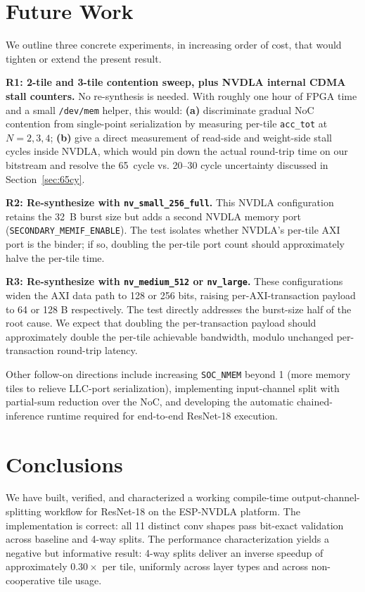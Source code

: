 \documentclass[10pt,sigconf,nonacm]{acmart}
\begin{document}
\section{Future Work}\label{sec:future}

We outline three concrete experiments, in increasing order of cost,
that would tighten or extend the present result.

\noindent\textbf{R1: 2-tile and 3-tile contention sweep, plus NVDLA
internal CDMA stall counters.} No re-synthesis is needed. With
roughly one hour of FPGA time and a small
\texttt{/dev/mem} helper, this would:
\textbf{(a)} discriminate gradual NoC contention from single-point
serialization by measuring per-tile \texttt{acc\_tot} at $N=2,3,4$;
\textbf{(b)} give a direct measurement of read-side and weight-side
stall cycles inside NVDLA, which would pin down the actual
round-trip time on our bitstream and resolve the 65~cycle vs.
20--30 cycle uncertainty discussed in Section~\ref{sec:65cy}.

\noindent\textbf{R2: Re-synthesize with \texttt{nv\_small\_256\_full}.}
This NVDLA configuration retains the 32~B burst size but adds a
second NVDLA memory port (\texttt{SECONDARY\_MEMIF\_ENABLE}). The
test isolates whether NVDLA's per-tile AXI port is the binder; if
so, doubling the per-tile port count should approximately halve
the per-tile time.

\noindent\textbf{R3: Re-synthesize with \texttt{nv\_medium\_512} or
\texttt{nv\_large}.} These configurations widen the AXI data path
to 128 or 256 bits, raising per-AXI-transaction payload to 64 or
128 B respectively. The test directly addresses the burst-size
half of the root cause. We expect that doubling the per-transaction
payload should approximately double the per-tile achievable
bandwidth, modulo unchanged per-transaction round-trip latency.

Other follow-on directions include increasing \texttt{SOC\_NMEM}
beyond 1 (more memory tiles to relieve LLC-port serialization),
implementing input-channel split with partial-sum reduction over the
NoC, and developing the automatic chained-inference runtime
required for end-to-end ResNet-18 execution.


\section{Conclusions}\label{sec:concl}

We have built, verified, and characterized a working
compile-time output-channel-splitting workflow for ResNet-18 on
the ESP-NVDLA platform. The implementation is correct: all 11
distinct conv shapes pass bit-exact validation across baseline
and 4-way splits. The performance characterization yields a
negative but informative result: 4-way splits deliver an inverse
speedup of approximately $0.30\times$ per tile, uniformly across
layer types and across non-cooperative tile usage.
\end{document}
